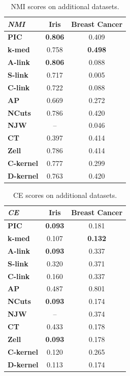 \begin{table}[h]
    \centering
    \begin{tabular}{|l|c|c|}
        \hline
        \textit{NMI} & \textbf{Iris} & \textbf{Breast Cancer} \\
        \hline
        \textbf{PIC}       & \textbf{0.806} & 0.409 \\ \hline
        \textbf{k-med}     & 0.758 & \textbf{0.498} \\ \hline
        \textbf{A-link}    & \textbf{0.806} & 0.088 \\ \hline
        \textbf{S-link}    & 0.717 & 0.005 \\ \hline
        \textbf{C-link}    & 0.722 & 0.088 \\ \hline
        \textbf{AP}        & 0.669 & 0.272 \\ \hline
        \textbf{NCuts}     & 0.786 & 0.420 \\ \hline
        \textbf{NJW}       & -- & 0.046 \\ \hline
        \textbf{CT}        & 0.397 & 0.414 \\ \hline
        \textbf{Zell}      & 0.786 & 0.414 \\ \hline
        \textbf{C-kernel}  & 0.777 & 0.299 \\ \hline
        \textbf{D-kernel}  & 0.763 & 0.420 \\
        \hline
        \end{tabular}
    \caption{NMI scores on additional datasets.}
    \label{table:nmi_additional}
\end{table}

\begin{table}[h]
    \centering
    \begin{tabular}{|l|c|c|}
        \hline
        \textit{CE} & \textbf{Iris} & \textbf{Breast Cancer} \\
        \hline
        \textbf{PIC}       & \textbf{0.093} & 0.181 \\ \hline
        \textbf{k-med}     & 0.107 & \textbf{0.132} \\ \hline
        \textbf{A-link}    & \textbf{0.093} & 0.337 \\ \hline
        \textbf{S-link}    & 0.320 & 0.371 \\ \hline
        \textbf{C-link}    & 0.160 & 0.337 \\ \hline
        \textbf{AP}        & 0.487 & 0.801 \\ \hline
        \textbf{NCuts}     & \textbf{0.093} & 0.174 \\ \hline
        \textbf{NJW}       & -- & 0.374 \\ \hline
        \textbf{CT}        & 0.433 & 0.178 \\ \hline
        \textbf{Zell}      & \textbf{0.093} & 0.178 \\ \hline
        \textbf{C-kernel}  & 0.120 & 0.265 \\ \hline
        \textbf{D-kernel}  & 0.113 & 0.174 \\
        \hline
        \end{tabular}
    \caption{CE scores on additional datasets.}
    \label{table:ce_additional}
\end{table}

